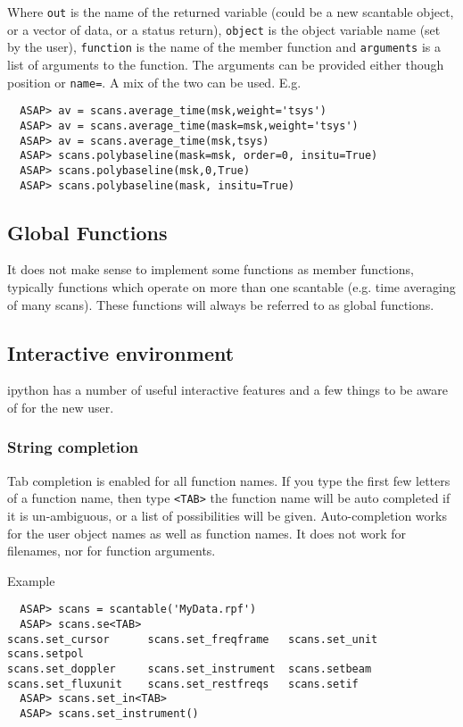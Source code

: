 \documentclass[11pt]{article}
\newcommand{\cmd}[1]{{\tt #1}}
\begin{document}
Where \cmd{out} is the name of the returned variable (could be a new
scantable object, or a vector of data, or a status return),
\cmd{object} is the object variable name (set by the user),
\cmd{function} is the name of the member function and \cmd{arguments}
is a list of arguments to the function. The arguments can be provided
either though position or \cmd{name=}.  A mix of the two can be used.
E.g.

\begin{verbatim}
  ASAP> av = scans.average_time(msk,weight='tsys')
  ASAP> av = scans.average_time(mask=msk,weight='tsys')
  ASAP> av = scans.average_time(msk,tsys)
  ASAP> scans.polybaseline(mask=msk, order=0, insitu=True)
  ASAP> scans.polybaseline(msk,0,True)
  ASAP> scans.polybaseline(mask, insitu=True)
\end{verbatim}

\subsection{Global Functions}

It does not make sense to implement some functions as member
functions, typically functions which operate on more than one
scantable (e.g. time averaging of many scans). These functions will
always be referred to as global functions.

\subsection{Interactive environment}

ipython has a number of useful interactive
features and a few things to be aware of for the new user.

\subsubsection{String completion}

Tab completion is enabled for all
function names. If you type the first few letters of a function name,
then type {\tt <TAB>} the function name will be auto completed if it
is un-ambiguous, or a list of possibilities will be
given. Auto-completion works for the user object names as well as
function names. It does not work for filenames, nor for function
arguments.

Example
\begin{verbatim}
  ASAP> scans = scantable('MyData.rpf')
  ASAP> scans.se<TAB>
scans.set_cursor      scans.set_freqframe   scans.set_unit        scans.setpol
scans.set_doppler     scans.set_instrument  scans.setbeam
scans.set_fluxunit    scans.set_restfreqs   scans.setif
  ASAP> scans.set_in<TAB>
  ASAP> scans.set_instrument()
\end{verbatim}
\end{document}

